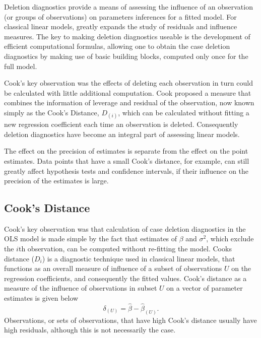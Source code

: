 \documentclass[12pt, a4paper]{report}
\theoremstyle{definition}
\theoremstyle{remark}
\begin{document}

Deletion diagnostics provide a means of assessing the influence of an observation (or groups of observations) on parameters inferences for a fitted model. For classical linear models, \citet{cook77} greatly expands the study of residuals and influence measures. The key to making deletion diagnostics useable is the development of efficient computational formulas, allowing one to obtain the  case deletion diagnostics by making use of basic building blocks, computed only once for the full model.


Cook's key observation was the effects of deleting each observation in turn could be calculated with little additional computation. Cook proposed a measure that combines the information of leverage and residual of the observation, now known simply as the Cook's Distance, $D_{(i)}$, which can be calculated without fitting a new regression coefficient each time an observation is deleted. Consequently deletion diagnostics have become an integral part of assessing linear models.

The effect on the precision of estimates is separate from the effect on the point estimates. Data points that have a small Cook's distance, for example, can still greatly affect hypothesis tests and confidence intervals, if their influence on the precision of the estimates is large.



\subsection{Cook's Distance}

Cook's key observation was that calculation of case deletion diagnostics in the OLS model is made simple by the fact that estimates of $\beta$ and $\sigma^2$, which exclude the $i$th observation, can be computed without re-fitting the model. 
 Cooks distance ($D_{i}$) is a diagnostic technique used in classical linear models, that functions as an overall measure of influence of a subset of observations $U$ on the regression coefficients, and consequently the fitted values.  Cook's distance as a measure of the influence of observations in subset $U$ on a vector of parameter estimates is given below \citep{cook77}
\[ \delta_{(U)} = \hat{\beta} - \hat{\beta}_{(U)}.\]
Observations, or sets of observations, that have high Cook's distance usually have high residuals, although this is not necessarily the case.
\end{document}
